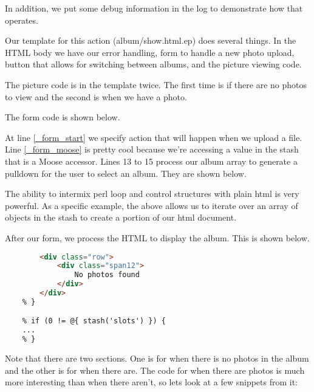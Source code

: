 \documentclass[14pt]{extreport}
\newcommand\Small{\fontsize{10}{10.2}\selectfont}
\newcommand*\LSTfont{\Small\ttfamily\SetTracking{encoding=*}{-60}\lsstyle}
\begin{document}
In addition, we put some debug information in the log to demonstrate how that
operates.



Our template for this action (album/show.html.ep) does several things. In the
HTML body we have our error handling, form to handle a new photo upload, button
that allows for switching between albums, and the picture viewing code.  

The picture code is in the template twice.  The first time is if there are no
photos to view and the second is when we have a photo.

The form code is shown below.



At line \ref{_form_start} we specify action that will happen when we upload a
file.  Line \ref{_form_moose} is pretty cool because we're accessing a value in
the stash that is a Moose accessor.  Lines 13 to 15 process our album array to  %
generate a pulldown for the user to select an album.  They are shown below.



The ability to intermix perl loop and control structures with plain html is
very powerful. As a specific example, the above allows us to iterate over an 
array of objects in the stash to create a portion of our html document.

After our form, we process the HTML to display the album.  This is shown below.

\begin{lstlisting}[language=Html, style=BlockStyle]
    % if (0 == @{ stash('slots') }) {
        <div class="row">
            <div class="span12">
                No photos found
            </div>
        </div>
    % }

    % if (0 != @{ stash('slots') }) {
    ...
    % }
\end{lstlisting}

Note that there are two sections.  One is for when there is no photos in the album
and the other is for when there are.  The code for when there are photos is much
more interesting than when there aren't, so lets look at a few snippets from it:
\end{document}
